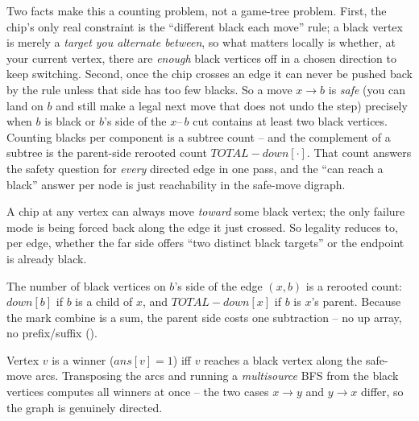 Two facts make this a counting problem, not a game-tree problem. First, the chip's
only real constraint is the ``different black each move'' rule; a black vertex is
merely a \emph{target you alternate between}, so what matters locally is whether,
at your current vertex, there are \emph{enough} black vertices off in a chosen
direction to keep switching. Second, once the chip crosses an edge it can never be
pushed back by the rule unless that side has too few blacks. So a move
$x\!\to\!b$ is \emph{safe} (you can land on $b$ and still make a legal next move
that does not undo the step) precisely when $b$ is black or $b$'s side of the
$x\!\text{--}\,b$ cut contains at least two black vertices. Counting blacks per
component is a subtree count -- and the complement of a subtree is the parent-side
rerooted count $\mathit{TOTAL}-\mathit{down}[\cdot]$. That count answers the safety
question for \emph{every} directed edge in one pass, and the ``can reach a black''
answer per node is just reachability in the safe-move digraph.

\begin{observation}
A chip at any vertex can always move \emph{toward} some black vertex; the only
failure mode is being forced back along the edge it just crossed. So legality
reduces to, per edge, whether the far side offers ``two distinct black targets''
or the endpoint is already black.
\end{observation}
\begin{observation}
The number of black vertices on $b$'s side of the edge $(x,b)$ is a rerooted
count: $\mathit{down}[b]$ if $b$ is a child of $x$, and $\mathit{TOTAL}-
\mathit{down}[x]$ if $b$ is $x$'s parent. Because the mark combine is a sum, the
parent side costs one subtraction -- no up array, no prefix/suffix
().
\end{observation}
\begin{observation}
Vertex $v$ is a winner ($\mathit{ans}[v]=1$) iff $v$ reaches a black vertex along
the safe-move arcs. Transposing the arcs and running a \emph{multisource} BFS from
the black vertices computes all winners at once -- the two cases $x\!\to\!y$ and
$y\!\to\!x$ differ, so the graph is genuinely directed.
\end{observation}

